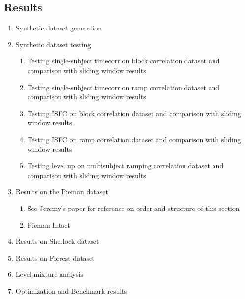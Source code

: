 \documentclass[12pt]{article}
\begin{document}
\subsection{Results}
\begin{enumerate}
\item Synthetic dataset generation
\item Synthetic dataset testing
\begin{enumerate}
\item Testing single-subject timecorr on block correlation dataset and comparison with sliding window results
\item Testing single-subject timecorr on ramp correlation dataset and comparison with sliding window results
\item Testing ISFC on block correlation dataset and comparison with sliding window results
\item Testing ISFC on ramp correlation dataset and comparison with sliding window results
\item Testing level up on multisubject ramping correlation dataset and comparison with sliding window results
\end{enumerate}
\item Results on the Pieman dataset
\begin{enumerate}
\item See Jeremy's paper for reference on order and structure of this section\\
\item Pieman Intact
\end{enumerate}
\item Results on Sherlock dataset
\item Results on Forrest dataset
\item Level-mixture analysis
\item Optimization and Benchmark results

\end{enumerate}
\end{document}
